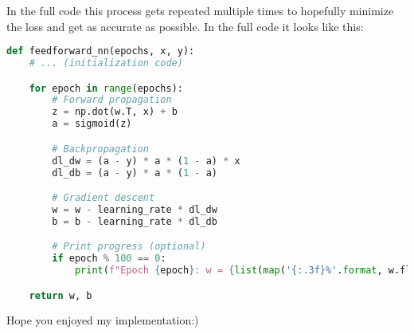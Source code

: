 \documentclass{article}
\begin{document}
In the full code this process gets repeated multiple times to hopefully minimize the loss and get as accurate as possible. In the full code it looks like this:

\begin{lstlisting}[language=Python]
def feedforward_nn(epochs, x, y):
    # ... (initialization code)

    for epoch in range(epochs):
        # Forward propagation
        z = np.dot(w.T, x) + b
        a = sigmoid(z)

        # Backpropagation
        dl_dw = (a - y) * a * (1 - a) * x
        dl_db = (a - y) * a * (1 - a)

        # Gradient descent
        w = w - learning_rate * dl_dw
        b = b - learning_rate * dl_db

        # Print progress (optional)
        if epoch % 100 == 0:
            print(f"Epoch {epoch}: w = {list(map('{:.3f}%'.format, w.flatten()))}, b = {list(map('{:.3f}%'.format,b))}, loss = {list(map('{:.3f}%'.format,(a - y) ** 2))}")

    return w, b
\end{lstlisting}
Hope you enjoyed my implementation:)
\end{document}
